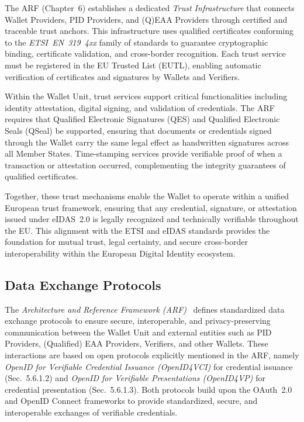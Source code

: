 \documentclass[sigconf,balance,nonacm,authordraft]{acmart}
\begin{document}
The ARF (Chapter~6) establishes a dedicated \textit{Trust Infrastructure} that connects Wallet Providers, PID Providers, and (Q)EAA Providers through certified and traceable trust anchors. This infrastructure uses qualified certificates conforming to the \textit{ETSI~EN~319~4xx} family of standards to guarantee cryptographic binding, certificate validation, and cross-border recognition. Each trust service must be registered in the EU Trusted List (EUTL), enabling automatic verification of certificates and signatures by Wallets and Verifiers.

Within the Wallet Unit, trust services support critical functionalities including identity attestation, digital signing, and validation of credentials. The ARF requires that Qualified Electronic Signatures (QES) and Qualified Electronic Seals (QSeal) be supported, ensuring that documents or credentials signed through the Wallet carry the same legal effect as handwritten signatures across all Member States. Time-stamping services provide verifiable proof of when a transaction or attestation occurred, complementing the integrity guarantees of qualified certificates.

Together, these trust mechanisms enable the Wallet to operate within a unified European trust framework, ensuring that any credential, signature, or attestation issued under eIDAS~2.0 is legally recognized and technically verifiable throughout the EU. This alignment with the ETSI and eIDAS standards provides the foundation for mutual trust, legal certainty, and secure cross-border interoperability within the European Digital Identity ecosystem.

\subsection{Data Exchange Protocols}

The \textit{Architecture and Reference Framework (ARF)}~\cite{EU_ARF2024} defines standardized data exchange protocols to ensure secure, interoperable, and privacy-preserving communication between the Wallet Unit and external entities such as PID Providers, (Qualified) EAA Providers, Verifiers, and other Wallets. These interactions are based on open protocols explicitly mentioned in the ARF, namely \textit{OpenID for Verifiable Credential Issuance (OpenID4VCI)} for credential issuance (Sec.~5.6.1.2) and \textit{OpenID for Verifiable Presentations (OpenID4VP)} for credential presentation (Sec.~5.6.1.3). Both protocols build upon the OAuth~2.0 and OpenID Connect frameworks to provide standardized, secure, and interoperable exchanges of verifiable credentials.
\end{document}
